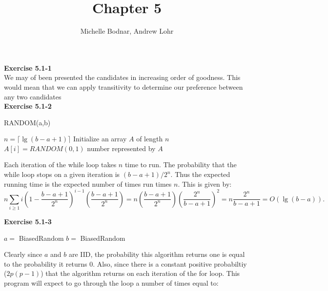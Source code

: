 \documentclass{article}
\title{Chapter 5}
\author{Michelle Bodnar, Andrew Lohr}
\begin{document}
\maketitle

\noindent\textbf{Exercise 5.1-1}\\

We may of been presented the candidates in increasing order of goodness. This would mean that we can apply transitivity to determine our preference between any two candidates\\

\noindent\textbf{Exercise 5.1-2}\\

\begin{algorithm}
\caption{RANDOM(a,b)}
\begin{algorithmic}[1]
\State $n = \lceil \lg(b-a+1) \rceil$
\State Initialize an array $A$ of length $n$
		\State $A[i] = RANDOM(0,1)$
	\EndFor
		\State \Return number represented by $A$
	\EndIf
\EndWhile
\end{algorithmic}
\end{algorithm}

Each iteration of the while loop takes $n$ time to run. The probability that the while loop stops on a given iteration is $(b-a+1) / 2^n$.  Thus the expected running time is the expected number of times run times $n$.  This is given by:
\[ n\sum_{i \geq 1}  i\left(1-\frac{b-a+1}{2^n}\right)^{i-1}\left(\frac{b-a+1}{2^n}\right) = n\left(\frac{b-a+1}{2^n}\right) \left(\frac{2^n}{b-a+1}\right)^2 = n\frac{2^n}{b-a+1} = O(\lg(b-a)).\]

\noindent\textbf{Exercise 5.1-3}\\

\begin{algorithm}
\begin{algorithmic}[1]
\State $a =$ BiasedRandom
\State $b =$ BiasedRandom
\State {}
\EndIf
{}
\State {}
\EndIf
\EndFor
\end{algorithmic}
\end{algorithm}
Clearly since $a$ and $b$ are IID, the probability this algorithm returns one is equal to the probability it returns 0. Also, since there is a constant positive probabiltiy ($2 p(p-1)$) that the algorithm returns on each iteration of the for loop. This program will expect to go through the loop a number of times equal to:
\end{document}

